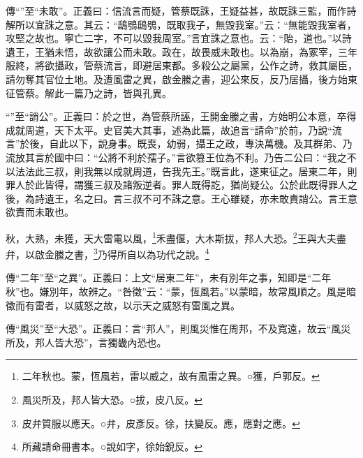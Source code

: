 {\noindent\zhuan{}\fzbyks 傳“”至“未敢”。正義曰：信流言而疑，管蔡既誅，王疑益甚，故既誅三監，而作詩解所以宜誅之意。其云：“鴟鴞鴟鴞，既取我子，無毀我室。”云：“無能毀我室者，攻堅之故也。寧亡二字，不可以毀我周室。”言宜誅之意也。云：“貽，道也。”以詩遺王，王猶未悟，故欲讓公而未敢。政在，故畏威未敢也。以為崩，為冢宰，三年服終，將欲攝政，管蔡流言，即避居東都。多殺公之屬黨，公作之詩，救其屬臣，請勿奪其官位土地。及遭風雷之異，啟金縢之書，迎公來反，反乃居攝，後方始東征管蔡。解此一篇乃之詩，皆與孔異。 \par}

{\noindent\shu{}\fzkt “”至“誚公”。正義曰：於之世，為管蔡所誣，王開金縢之書，方始明公本意，卒得成就周道，天下太平。史官美大其事，述為此篇，故追言“請命”於前，乃說“流言”於後，自此以下，說身事。既喪，幼弱，攝王之政，專決萬機。及其群弟、乃流放其言於國中曰：“公將不利於孺子。”言欲篡王位為不利。乃告二公曰：“我之不以法法此三叔，則我無以成就周道，告我先王。”既言此，遂東征之。居東二年，則罪人於此皆得，謂獲三叔及諸叛逆者。罪人既得訖，猶尚疑公。公於此既得罪人之後，為詩遺王，名之曰。言三叔不可不誅之意。王心雖疑，亦未敢責誚公。言王意欲責而未敢也。 \par}

秋，大熟，未獲，天大雷電以風，\footnote{二年秋也。蒙，恆風若，雷以威之，故有風雷之異。○獲，戶郭反。}禾盡偃，大木斯拔，邦人大恐。\footnote{風災所及，邦人皆大恐。○拔，皮八反。}王與大夫盡弁，以啟金縢之書，\footnote{皮弁質服以應天。○弁，皮彥反。徐，扶變反。應，應對之應。}乃得所自以為功代之說。\footnote{所藏請命冊書本。○說如字，徐始銳反。}


{\noindent\zhuan{}\fzbyks 傳“二年”至“之異”。正義曰：上文“居東二年”，未有別年之事，知即是“二年秋”也。嫌別年，故辨之。“咎徵”云：“蒙，恆風若。”以蒙暗，故常風順之。風是暗徵而有雷者，以威怒之故，以示天之威怒有雷風之異。 \par}

{\noindent\zhuan{}\fzbyks 傳“風災”至“大恐”。正義曰：言“邦人”，則風災惟在周邦，不及寬遠，故云“風災所及，邦人皆大恐”，言獨畿內恐也。 \par}

